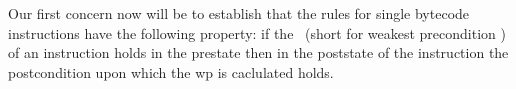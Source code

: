  





Our first concern now will  be to establish that the rules for single bytecode instructions have the following property:
 if the \fwpi \ (short for weakest precondition ) of an 
instruction holds in the prestate then in the poststate of the instruction the postcondition upon which the wp is caclulated holds. 

